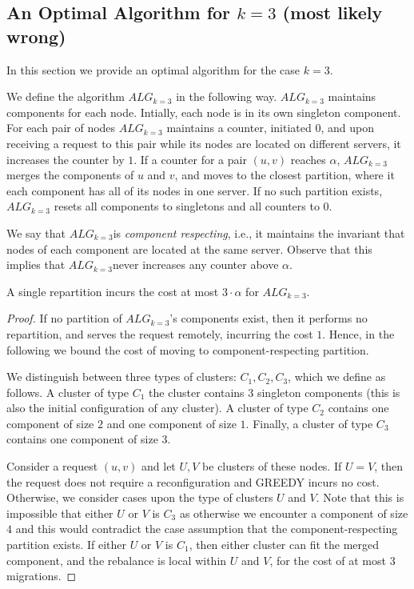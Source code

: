 \documentclass[manuscript,screen=true]{acmart}
\newcommand{\TAlg}{{\ensuremath{ALG_{k=3}}}} %
\newcommand\maciek[1]{\color{brown}\textbf{\\ Maciek: #1}\color{black}}
\begin{document}
\begin{appendix}
  \section{An Optimal Algorithm for $k=3$ (most likely wrong)}

  In this section we provide an optimal algorithm for the case $k=3$.
  
  We define the algorithm \TAlg{} in the following way.
  \TAlg{} maintains components for each node.
  Intially, each node is in its own singleton component.
  For each pair of nodes \TAlg{} maintains a counter, initiated $0$, and upon receiving a request to this pair while its nodes are located on different servers, it increases the counter by $1$.
  If a counter for a pair $(u,v)$ reaches $\alpha$, \TAlg{} merges the components of $u$ and $v$, and moves to the closest partition, where it each component has all of its nodes in one server.
  If no such partition exists, \TAlg{} resets all components to singletons and all counters to $0$.


  We say that \TAlg is \emph{component respecting}, i.e., it maintains the invariant that nodes of each component are located at the same server.
  Observe that this implies that \TAlg never increases any counter above $\alpha$.
  
  \begin{lemma}
    \label{lem:1req}
    A single repartition incurs the cost at most $3\cdot\alpha$ for \TAlg.
  \end{lemma}
  
  \begin{proof}
    If no partition of \TAlg's components exist, then it performs no repartition, and serves the request remotely, incurring the cost $1$.
    Hence, in the following we bound the cost of moving to component-respecting partition.
  
    We distinguish between three types of clusters: $C_1, C_2, C_3$,
    which we define as follows.
    A cluster of type $C_1$ the cluster contains $3$ singleton components (this is also the initial configuration of any cluster).
    A cluster of type $C_2$  contains one component of size $2$ and one component of size $1$.
    Finally, a cluster of type $C_3$  contains one component of size $3$.
    
      Consider a request $(u, v)$ and let $U, V$ be clusters of these nodes.
      If $U=V$, then the request does not require a reconfiguration and GREEDY incurs no cost.
      Otherwise, we consider cases upon the type of clusters $U$ and $V$.
      Note that this is impossible that either $U$ or $V$ is $C_3$ as otherwise we encounter a component of size $4$ and this would contradict the case assumption that the component-respecting partition exists.
      If either $U$ or $V$ is $C_1$, then either cluster can fit the merged component, and the rebalance is local within $U$ and $V$, for the cost of at most $3$ migrations.
    

\end{proof}
\end{appendix}
\end{document}
